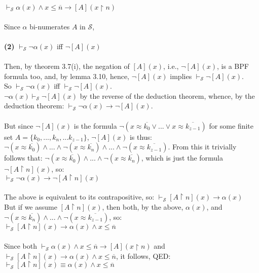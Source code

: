 \documentclass{article}
\begin{document}
$\vdash_{\mathscr{S}} \alpha(x) \wedge x \leq \overline{n} \rightarrow [A](x\upharpoonright n)$\\\\
Since $\alpha$ bi-numerates  $A$ in $\mathscr{S}$,\\\\\textbf{(2)} $\vdash_{\mathscr{S}} \neg\alpha(x)$  iff  $\neg[A](x)$\\\\
Then, by theorem 3.7(i), the negation of $[A](x)$, i.e., $\neg[A](x)$, is a BPF formula too, and, by lemma 3.10, hence, $\neg[A](x)$ implies $\vdash_{\mathscr{S}} \neg[A](x)$.\\
So $\vdash_{\mathscr{S}}\neg\alpha(x)$ iff $\vdash_{\mathscr{S}} \neg[A](x).$\\
$\neg\alpha(x)\vdash_{\mathscr{S}}\neg[A](x)$ by the reverse of the deduction theorem, whence, by the deduction theorem: $\vdash_{\mathscr{S}} \neg\alpha(x) \rightarrow \neg[A](x)$.\\\\
But since $\neg[A](x)$ is the formula $\neg(x \approx \overline{k_0} \vee . . . \vee x \approx \overline{k_{z - 1}})$ for some finite set $A = \{k_{0}, ..., k_{n}, ... k_{z-1}\}$, $\neg[A](x)$ is thus:\\ $\neg (x \approx \overline{k_0}) \wedge . . . \wedge \neg(x \approx \overline{k_{n}})\wedge ... \wedge \neg(x \approx \overline{k_{z - 1}})$. From this it trivially follows that: $\neg (x \approx \overline{k_0}) \wedge . . . \wedge \neg(x \approx \overline{k_{n}})$, which is just the formula $\neg[A\upharpoonright n](x)$, so:\\
$\vdash_{\mathscr{S}} \neg\alpha(x) \rightarrow \neg[A\upharpoonright n](x)$\\\\
The above is equivalent to its contrapositive, so: $\vdash_{\mathscr{S}} [A\upharpoonright n](x) \rightarrow \alpha(x)$\\
But if we assume $[A\upharpoonright n](x)$, then both, by the above, $\alpha(x)$, and\\ $\neg(x \approx \overline{k_{n}})\wedge ... \wedge \neg(x \approx \overline{k_{z - 1}})$, so:\\

$\vdash_{\mathscr{S}} [A\upharpoonright n](x) \rightarrow \alpha(x) \wedge x \leq \overline{n}$\\\\
Since both $\vdash_{\mathscr{S}} \alpha(x) \wedge x \leq \overline{n} \rightarrow [A](x\upharpoonright n)$ and $\vdash_{\mathscr{S}} [A\upharpoonright n](x) \rightarrow \alpha(x) \wedge x \leq \overline{n}$, it follows, QED:\\
$\vdash_{\mathscr{S}} [A\upharpoonright n](x) \equiv \alpha(x) \wedge x \leq \overline{n}$
\end{document}
